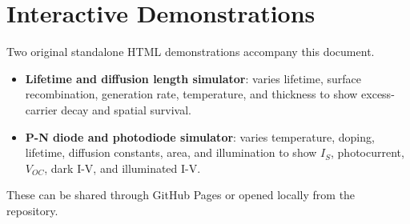 \documentclass[11pt,a4paper]{article}
\begin{document}
\section{Interactive Demonstrations}

Two original standalone HTML demonstrations accompany this document.
\begin{itemize}
  \item \textbf{Lifetime and diffusion length simulator}: varies lifetime, surface recombination, generation rate, temperature, and thickness to show excess-carrier decay and spatial survival.
  \item \textbf{P-N diode and photodiode simulator}: varies temperature, doping, lifetime, diffusion constants, area, and illumination to show \(I_S\), photocurrent, \(V_{OC}\), dark I-V, and illuminated I-V.
\end{itemize}

These can be shared through GitHub Pages or opened locally from the repository.
\end{document}
